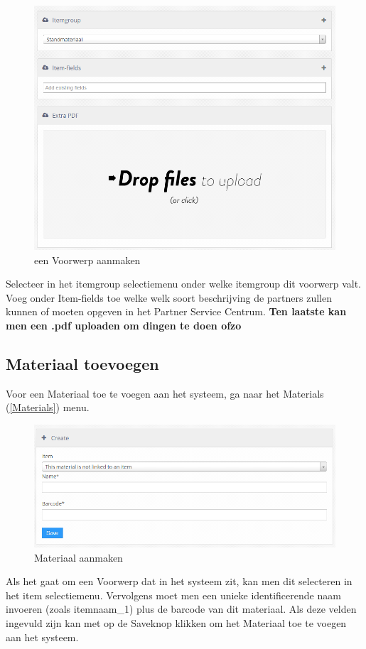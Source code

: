 \documentclass[]{memoir}
\begin{document}
\begin{figure}[H]
	\includegraphics[width=\linewidth]{addItem_right}
	\caption{een Voorwerp aanmaken}
\end{figure}
Selecteer in het itemgroup selectiemenu onder welke itemgroup dit voorwerp valt. 
Voeg onder Item-fields toe welke welk soort beschrijving de partners zullen kunnen of moeten opgeven in het Partner Service Centrum. 
\textbf{Ten laatste kan men een .pdf uploaden om dingen te doen ofzo}
\subsection{Materiaal toevoegen} \label{SetMaterial}
Voor een Materiaal toe te voegen aan het systeem, ga naar het Materials (\ref{Materials}) menu. \\
\begin{figure}[H]
	\includegraphics[width=\linewidth]{addMaterial}
	\caption{Materiaal aanmaken}
\end{figure}
Als het gaat om een Voorwerp dat in het systeem zit, kan men dit selecteren in het item selectiemenu.
Vervolgens moet men een unieke identificerende naam invoeren (zoals itemnaam\_1) plus de barcode van dit materiaal.
Als deze velden ingevuld zijn kan met op de Saveknop klikken om het Materiaal toe te voegen aan het systeem.
\end{document}
